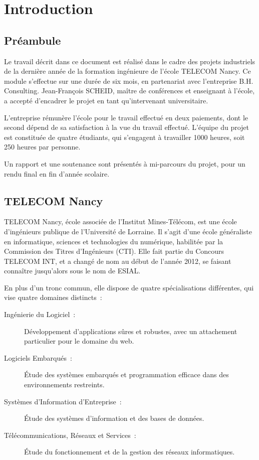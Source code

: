 \newcommand{\titreA}{Solution efficiente pour la s\'{e}curisation des r\'{e}seaux d'entreprise}
\newcommand{\titreB}{Rapport de projet industriel}


\listoffigures
\newpage

\section{Introduction}
\subsection{Préambule}

Le travail décrit dans ce document est réalisé dans le cadre des projets industriels de la dernière année de la formation ingénieure de l'école TELECOM Nancy. Ce module s'effectue sur une durée de six mois, en partenariat avec l'entreprise B.H. Consulting. Jean-François SCHEID, maître de conférences et enseignant à l'école, a accepté d'encadrer le projet en tant qu'intervenant universitaire.

L'entreprise rémunère l'école pour le travail effectué en deux paiements, dont le second dépend de sa satisfaction à la vue du travail effectué. L'équipe du projet est constituée de quatre étudiants, qui s'engagent à travailler 1000 heures, soit 250 heures par personne.

Un rapport et une soutenance sont présentés à mi-parcours du projet, pour un rendu final en fin d'année scolaire.

\subsection{TELECOM Nancy}

TELECOM Nancy, école associée de l'Institut Mines-Télécom, est une école d'ingénieurs publique de l'Université de Lorraine. Il s'agit d'une école généraliste en informatique, sciences et technologies du numérique, habilitée par la Commission des Titres d'Ingénieurs (CTI). Elle fait partie du Concours TELECOM INT, et a changé de nom au début de l'année 2012, se faisant connaître jusqu'alors sous le nom de ESIAL.

En plus d'un tronc commun, elle dispose de quatre spécialisations différentes, qui vise quatre domaines distincts~:

\begin{description}
\item[Ingénierie du Logiciel~:] Développement d'applications sûres et robustes, avec un attachement particulier pour le domaine du web.
\item[Logiciels Embarqués~:] Étude des systèmes embarqués et programmation efficace dans des environnements restreints.
\item[Systèmes d'Information d'Entreprise~:] Étude des systèmes d'information et des bases de données.
\item[Télécommunications, Réseaux et Services~:] Étude du fonctionnement et de la gestion des réseaux informatiques.
\end{description}

